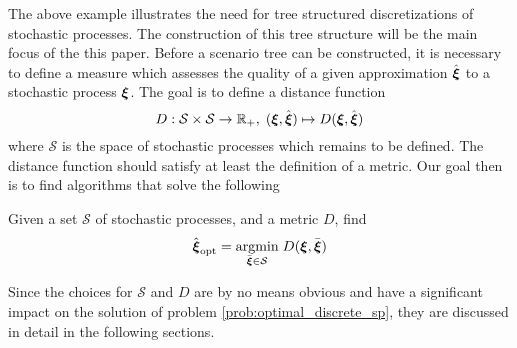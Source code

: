 The above example illustrates the need for tree structured discretizations of stochastic processes. The construction of this tree structure will be the main focus of the this paper. Before a scenario tree can be constructed, it is necessary to define a measure which assesses the quality of a given approximation $\hat{\boldsymbol\xi}$ to a stochastic process $\boldsymbol\xi$. The goal is to define a distance function
\begin{equation}
  \label{eq:distance-function-intro}
  D:\mathcal{S} \times \mathcal{S} \rightarrow \mathbb{R}_+,\;(\boldsymbol\xi, \hat{\boldsymbol\xi})\mapsto D(
\boldsymbol\xi, \hat{\boldsymbol\xi})
\end{equation}
where $\mathcal{S}$ is the space of stochastic processes which remains to be defined. The distance function should satisfy at least the definition of a metric.
Our goal then is to find algorithms that solve the following
\begin{problem}
  \label{prob:optimal_discrete_sp}
  Given a set $\mathcal{S}$ of stochastic processes, and a metric $D$, find
  \begin{equation}
    \label{eq:60}
    \hat{\boldsymbol\xi}_{\mathrm{opt}} = \underset{\bar{\boldsymbol\xi}\in\mathcal{S}}{\operatorname{argmin}}\; D(\boldsymbol\xi,\bar{\boldsymbol\xi})
  \end{equation}
\end{problem}
Since the choices for $\mathcal{S}$ and $D$ are by no means obvious and have a significant impact on the solution of problem \ref{prob:optimal_discrete_sp}, they are discussed in detail in the following sections.
